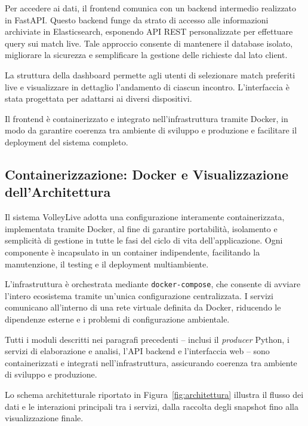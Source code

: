 \documentclass[a4paper,12pt]{report}
\begin{document}
Per accedere ai dati, il frontend comunica con un backend intermedio realizzato in FastAPI. Questo backend funge da strato di accesso alle informazioni archiviate in Elasticsearch, esponendo API REST personalizzate per effettuare query sui match live. Tale approccio consente di mantenere il database isolato, migliorare la sicurezza e semplificare la gestione delle richieste dal lato client.

La struttura della dashboard permette agli utenti di selezionare match preferiti live e visualizzare in dettaglio l’andamento di ciascun incontro. L’interfaccia è stata progettata per adattarsi ai diversi dispositivi.

Il frontend è containerizzato e integrato nell’infrastruttura tramite Docker, in modo da garantire coerenza tra ambiente di sviluppo e produzione e facilitare il deployment del sistema completo.


\subsection{Containerizzazione: Docker e Visualizzazione dell’Architettura}

Il sistema VolleyLive adotta una configurazione interamente containerizzata, implementata tramite Docker, al fine di garantire portabilità, isolamento e semplicità di gestione in tutte le fasi del ciclo di vita dell’applicazione. Ogni componente è incapsulato in un container indipendente, facilitando la manutenzione, il testing e il deployment multiambiente.

L’infrastruttura è orchestrata mediante \texttt{docker-compose}, che consente di avviare l’intero ecosistema tramite un’unica configurazione centralizzata. I servizi comunicano all’interno di una rete virtuale definita da Docker, riducendo le dipendenze esterne e i problemi di configurazione ambientale.

Tutti i moduli descritti nei paragrafi precedenti – inclusi il \textit{producer} Python, i servizi di elaborazione e analisi, l’API backend e l’interfaccia web – sono containerizzati e integrati nell’infrastruttura, assicurando coerenza tra ambiente di sviluppo e produzione.

Lo schema architetturale riportato in Figura~\ref{fig:architettura} illustra il flusso dei dati e le interazioni principali tra i servizi, dalla raccolta degli snapshot fino alla visualizzazione finale.
\end{document}
